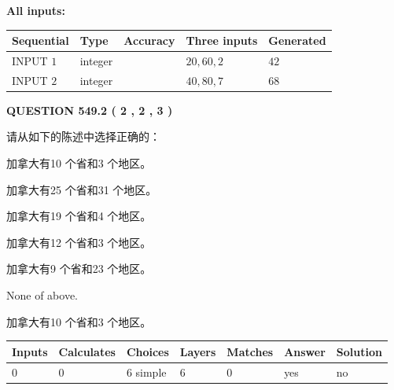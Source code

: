 \documentclass{ctexart}
\begin{document}
   
   
   
\noindent\vspace{0.1in}\hspace{-0.08in} {\textbf{\Large{All inputs: }}}
   
   
  
  
\noindent\begin{tabular}{|l|l|l|l|l|}
\hline
 Sequential & Type & Accuracy & Three inputs & Generated \\ 
\hline
 
 
  INPUT $  1 $ & integer &  & $
 20
 , 
 60
 , 
 2
 $ & $ 42 $ 
 \\  \hline  
 
 
  INPUT $  2 $ & integer &  & $
 40
 , 
 80
 , 
 7
 $ & $ 68 $ 
 \\  \hline  
 \end{tabular}
   
   
  
\vspace{0.2in}
  
{\textbf{\Large{QUESTION
549.2 
 ( 2 , 2 , 3 )
}}}
  
  
请从如下的陈述中选择正确的：
 
 
加拿大有10 个省和3 个地区。
 
 
加拿大有25 个省和31 个地区。
 
 
加拿大有19 个省和4 个地区。
 
 
加拿大有12 个省和3 个地区。
 
 
加拿大有9 个省和23 个地区。
 
 
 None of above.
 
 
\noindent{}
 
 
加拿大有10 个省和3 个地区。
 
 
\noindent{}
 
 
   
   
   
   
\noindent\begin{tabular}{|l|l|l|l|l|l|l|}
 \hline
Inputs & Calculates & Choices & Layers & Matches & Answer & Solution \\ \hline
 0  & 
 0  & 
 6
  simple  
  & 
 6  & 
 0  & 
  yes & 
  no 
  \\ \hline
 \end{tabular}
   
\end{document}
